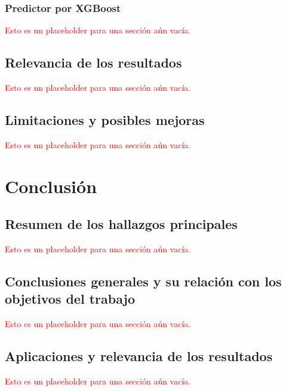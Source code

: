 \documentclass[a4paper]{report}
\begin{document}
\subsection{Predictor por XGBoost}
\textcolor{red}{Esto es un placeholder para una sección aún vacía.}



\section{Relevancia de los resultados}
\textcolor{red}{Esto es un placeholder para una sección aún vacía.}



\section{Limitaciones y posibles mejoras}
\textcolor{red}{Esto es un placeholder para una sección aún vacía.}




\chapter{Conclusión}

\section{Resumen de los hallazgos principales}
\textcolor{red}{Esto es un placeholder para una sección aún vacía.}



\section{Conclusiones generales y su relación con los objetivos del trabajo}
\textcolor{red}{Esto es un placeholder para una sección aún vacía.}



\section{Aplicaciones y relevancia de los resultados}
\textcolor{red}{Esto es un placeholder para una sección aún vacía.}



\end{document}
